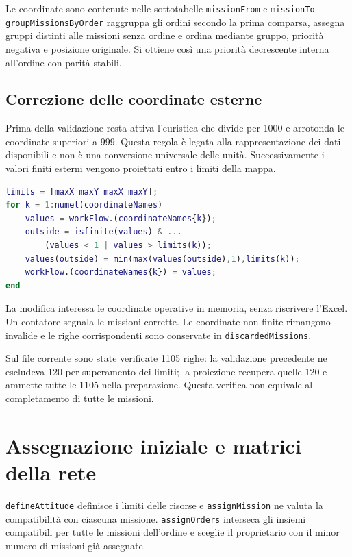 Le coordinate sono contenute nelle sottotabelle \texttt{missionFrom}
e \texttt{missionTo}. \texttt{groupMissionsByOrder} raggruppa gli ordini
secondo la prima comparsa, assegna gruppi distinti alle missioni senza ordine
e ordina mediante gruppo, priorità negativa e posizione originale. Si
ottiene così una priorità decrescente interna all'ordine con parità stabili.

\subsection{Correzione delle coordinate esterne}

Prima della validazione resta attiva l'euristica che divide per 1000 e
arrotonda le coordinate superiori a 999. Questa regola è legata alla
rappresentazione dei dati disponibili e non è una conversione universale
delle unità. Successivamente i valori finiti esterni vengono proiettati
entro i limiti della mappa.

\begin{lstlisting}[language=Matlab,caption={Estratto della proiezione delle coordinate.},label={lst:impl-coordinate}]
limits = [maxX maxY maxX maxY];
for k = 1:numel(coordinateNames)
    values = workFlow.(coordinateNames{k});
    outside = isfinite(values) & ...
        (values < 1 | values > limits(k));
    values(outside) = min(max(values(outside),1),limits(k));
    workFlow.(coordinateNames{k}) = values;
end
\end{lstlisting}

La modifica interessa le coordinate operative in memoria, senza riscrivere
l'Excel. Un contatore segnala le missioni corrette. Le coordinate non finite
rimangono invalide e le righe corrispondenti sono conservate in
\texttt{discardedMissions}.

Sul file corrente sono state verificate 1105 righe: la validazione precedente
ne escludeva 120 per superamento dei limiti; la proiezione recupera quelle
120 e ammette tutte le 1105 nella preparazione. Questa verifica non equivale
al completamento di tutte le missioni.

\section{Assegnazione iniziale e matrici della rete}
\label{sec:impl-assegnazione}

\texttt{defineAttitude} definisce i limiti delle risorse e
\texttt{assignMission} ne valuta la compatibilità con ciascuna missione.
\texttt{assignOrders} interseca gli insiemi compatibili per tutte le
missioni dell'ordine e sceglie il proprietario con il minor numero di
missioni già assegnate.

